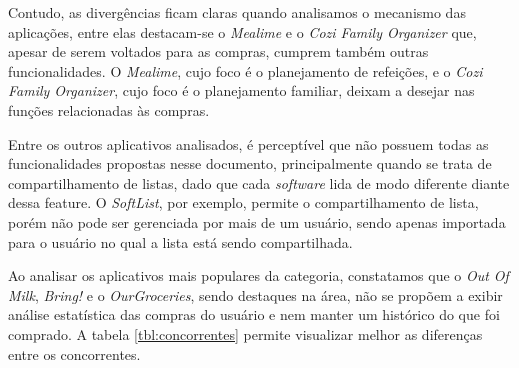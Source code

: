 Contudo, as divergências ficam claras quando analisamos o mecanismo das aplicações, entre elas destacam-se o \textit{Mealime} e o \textit{Cozi Family Organizer} que, apesar de serem voltados para as compras, cumprem também outras funcionalidades. O \textit{Mealime}, cujo foco é o planejamento de refeições, e o \textit{Cozi Family Organizer}, cujo foco é o planejamento familiar, deixam a desejar nas funções relacionadas às compras.

Entre os outros aplicativos analisados, é perceptível que não possuem todas as funcionalidades propostas nesse documento, principalmente quando se trata de compartilhamento de listas, dado	 que cada \textit{software} lida de modo diferente diante dessa feature. O \textit{SoftList}, por exemplo, permite o compartilhamento de lista, porém não pode  ser gerenciada por mais de um usuário, sendo apenas importada para o usuário no qual a lista está sendo compartilhada.

Ao analisar os aplicativos mais populares da categoria, constatamos que o \textit{Out Of Milk}, \textit{Bring!} e o \textit{OurGroceries}, sendo destaques na área, não se propõem a exibir análise estatística das compras do usuário e nem manter um histórico do que foi comprado. A tabela \ref{tbl:concorrentes} permite visualizar melhor as diferenças entre os concorrentes.

\label{tbl:concorrentes}
\begin{table}[h]
\centering
  \caption{Tabela \ref{tbl:concorrentes}: Uma comparação dos aplicativos concorrentes.}
\end{table}
